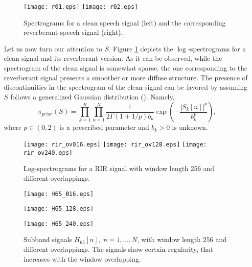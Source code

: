 \documentclass[12pt]{article}
\begin{document}
\begin{figure} [h]
	\centering
\texttt{[image: r01.eps]}
%
\texttt{[image: r02.eps]}
\caption{Spectrograms for a clean speech signal (left) and the corresponding reverberant speech signal (right).}
\label{fi:clean-rev}
\end{figure}

Let us now turn our attention to $S$. Figure \ref{fi:clean-rev} depicts the $\log$-spectrograms for a clean signal and its reverberant version. As it can be observed, while the spectrogram of the clean signal is somewhat sparse, the one corresponding to the reverberant signal presents a smoother or more diffuse structure. The presence of  discontinuities in the spectrogram of the clean signal can be favored by assuming $S$ follows a generalized Gaussian distribution (\cite{bouman1993}). Namely,
%
\begin{equation}
\pi_{prior}(S) =\prod_{k=1}^K \prod_{n=1}^N  \frac{1}{2\Gamma(1+1/p)b_k} \exp \left(-\frac{|S_k[n]|^p}{b_k^p}\right), \nonumber
\end{equation}
%
where $p\in(0,2)$ is a prescribed parameter and $b_k>0$ is unknown.

\begin{figure} [h]
	\centering
\texttt{[image: rir\_ov016.eps]}
%
\texttt{[image: rir\_ov128.eps]}
%
\texttt{[image: rir\_ov240.eps]}
%
\caption{Log-spectrograms for a RIR signal with window length 256 and different overlappings.}
\label{fi:rirspecs}
\end{figure}

\begin{figure} [h]
	\centering
\texttt{[image: H65\_016.eps]}

\texttt{[image: H65\_128.eps]}

\texttt{[image: H65\_240.eps]}

\caption{Subband signals $H_{65}[n], \; n = 1,\ldots, N$, with  window length 256 and different overlappings. The signals show certain regularity, that increases with the window overlapping.}
\label{fi:H65s}
\end{figure}
\end{document}
